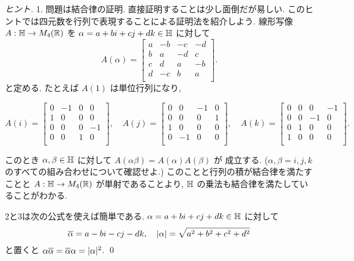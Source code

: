 \documentclass[12pt,twoside]{jarticle}
\begin{document}
\begin{proof}[ヒント]
 1. 問題は結合律の証明. 直接証明することは少し面倒だが易しい.
 このヒントでは四元数を行列で表現することによる証明法を紹介しよう.
 線形写像 $A:{\mathbb H}\to M_4({\mathbb R})$ を $\alpha=a+bi+cj+dk\in{\mathbb H}$ に対して
 \begin{equation*}
  A(\alpha) = 
  \left[
  \begin{array}{rrrr}
   a & -b & -c & -d \\
   b &  a & -d &  c \\
   c &  d &  a & -b \\
   d & -c &  b &  a \\
  \end{array}
  \right].
 \end{equation*}
 と定める.  たとえば $A(1)$ は単位行列になり, 
 \begin{small}
 \begin{equation*}
  A(i)=
  \left[
  \begin{array}{rrrr}
   0 & -1 &  0 &  0 \\
   1 &  0 &  0 &  0 \\
   0 &  0 &  0 & -1 \\
   0 &  0 &  1 &  0 \\
  \end{array}
  \right],
  \quad
  A(j) = 
  \left[
  \begin{array}{rrrr}
   0 &  0 & -1 &  0 \\
   0 &  0 &  0 &  1 \\
   1 &  0 &  0 &  0 \\
   0 & -1 &  0 &  0 \\
  \end{array}
  \right],
  \quad
  A(k) = 
  \left[
  \begin{array}{rrrr}
   0 &  0 &  0 & -1 \\
   0 &  0 & -1 &  0 \\
   0 &  1 &  0 &  0 \\
   1 &  0 &  0 &  0 \\
  \end{array}
  \right].
 \end{equation*}
 \end{small}%
 このとき $\alpha,\beta\in{\mathbb H}$ に対して $A(\alpha\beta)=A(\alpha)A(\beta)$ が
 成立する. ($\alpha,\beta=i,j,k$ のすべての組み合わせについて確認せよ.)
 このことと行列の積が結合律を満たすことと $A:{\mathbb H}\to M_4({\mathbb R})$
 が単射であることより, ${\mathbb H}$ の乗法も結合律を満たしていることがわかる.

 2と3は次の公式を使えば簡単である. 
 $\alpha = a + bi + cj + dk\in{\mathbb H}$ に対して
 \begin{equation*}
  \overline{\alpha} = a - bi - cj - dk, \quad
  |\alpha| = \sqrt{a^2+b^2+c^2+d^2}
 \end{equation*}
 と置くと $\alpha\overline{\alpha}=\overline{\alpha}\alpha=|\alpha|^2$.
 \qed
\end{proof}
\end{document}
